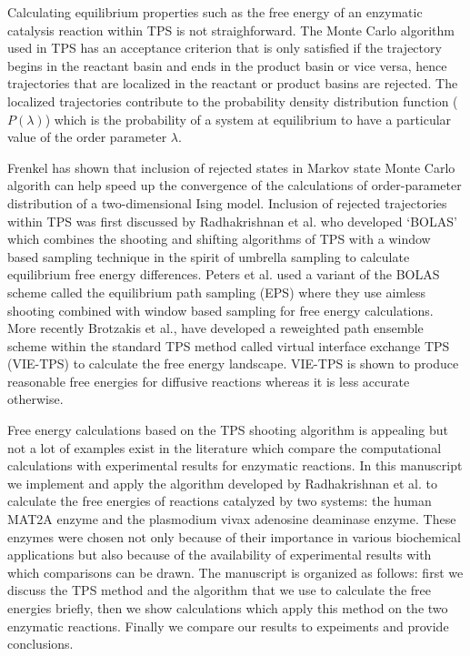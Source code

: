 \documentclass[journal=jpcbfk,manuscript=article,layout=traditional]{achemso}
\begin{document}
Calculating equilibrium properties such as the free energy of an enzymatic 
catalysis reaction within TPS is not straighforward. 
The Monte Carlo algorithm used in TPS has an acceptance criterion that 
is only satisfied if the trajectory begins in the reactant basin and ends in 
the product basin or vice versa, hence trajectories that are localized in the 
reactant or product basins are rejected. The localized trajectories contribute
to the probability density distribution function ($P(\lambda)$) which is the 
probability of a system at equilibrium to have a particular value of the 
order parameter $\lambda$. \cite{Dellago09AdvCompSimAppp167} 

Frenkel has shown that inclusion of rejected states in Markov state Monte 
Carlo algorith can help speed up the convergence of the calculations of 
order-parameter distribution of a two-dimensional
Ising model. \cite{Frenkel04ProcNatAcadSci101p17571}
Inclusion of rejected trajectories within TPS was first discussed by Radhakrishnan 
et al. \cite{Radhakrishnan04JChemPhys121p2436} who developed `BOLAS' which combines 
the shooting and shifting algorithms of TPS with a window based sampling technique 
in the spirit of umbrella sampling to calculate equilibrium free energy 
differences. Peters et al. used a variant of the BOLAS scheme called the 
equilibrium path sampling (EPS) where they use aimless shooting 
combined with window based sampling for free energy calculations. 
\cite{Peters08JAmChemSoc130p17342,Beckham10epsbook} 
More recently Brotzakis et al., \cite{Brotzakis19JChemPhys151p174111}
have developed a reweighted path ensemble scheme within the standard TPS method 
called virtual interface exchange TPS (VIE-TPS) to calculate the free energy 
landscape. VIE-TPS is shown to produce reasonable free energies for 
diffusive reactions whereas it is less accurate otherwise.

Free energy calculations based on the TPS shooting algorithm is 
appealing but not a lot of examples exist in the literature 
which compare the computational calculations with experimental
results for enzymatic reactions.  
In this manuscript we implement and apply the 
algorithm developed by Radhakrishnan et al. \cite{Radhakrishnan04JChemPhys121p2436} 
to calculate the free energies of reactions catalyzed by two systems:
the human MAT2A enzyme and the plasmodium vivax adenosine deaminase 
enzyme. \cite{Luo07JAmChemSoc129p8008,Ho09Biochemistry48p9618}
These enzymes were chosen not only because of their importance in various 
biochemical applications but also because of the availability of experimental 
results with which comparisons can be drawn. The manuscript is organized as 
follows: first we discuss the TPS method and the algorithm that we use 
to calculate the free energies briefly, then we show calculations which apply this 
method on the two enzymatic reactions. Finally we compare our results to expeiments
and provide conclusions. 
\end{document}
